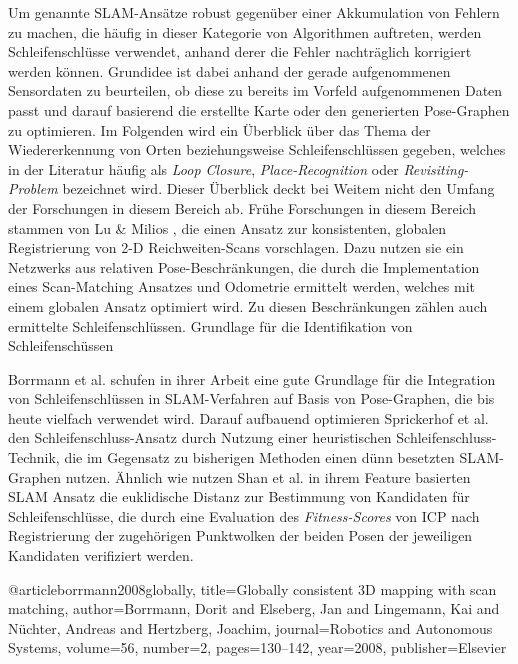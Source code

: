 Um genannte SLAM-Ansätze robust gegenüber einer Akkumulation von Fehlern zu machen, die häufig in dieser Kategorie von Algorithmen auftreten, werden Schleifenschlüsse verwendet, anhand derer die Fehler nachträglich korrigiert werden können. Grundidee ist dabei anhand der gerade aufgenommenen Sensordaten zu beurteilen, ob diese zu bereits im Vorfeld aufgenommenen Daten passt und darauf basierend die erstellte Karte oder den generierten Pose-Graphen zu optimieren. Im Folgenden wird ein Überblick über das Thema der Wiedererkennung von Orten beziehungsweise Schleifenschlüssen gegeben, welches in der Literatur häufig als \emph{Loop Closure}, \emph{Place-Recognition} oder \emph{Revisiting-Problem} bezeichnet wird. Dieser Überblick deckt bei Weitem nicht den Umfang der Forschungen in diesem Bereich ab. Frühe Forschungen in diesem Bereich stammen von Lu \& Milios \cite{lu1997globally}, die einen Ansatz zur konsistenten, globalen Registrierung von 2-D Reichweiten-Scans vorschlagen. Dazu nutzen sie ein Netzwerks aus relativen Pose-Beschränkungen, die durch die Implementation eines Scan-Matching Ansatzes und Odometrie ermittelt werden, welches mit einem globalen Ansatz optimiert wird. Zu diesen Beschränkungen zählen auch ermittelte Schleifenschlüssen. Grundlage für die Identifikation von Schleifenschüssen

Borrmann et al. \cite{borrmann2008globally} schufen in ihrer Arbeit eine gute Grundlage für die Integration von Schleifenschlüssen in SLAM-Verfahren auf Basis von Pose-Graphen, die bis heute vielfach verwendet wird. Darauf aufbauend optimieren Sprickerhof et al. \cite{sprickerhof2011heuristic} den Schleifenschluss-Ansatz durch Nutzung einer heuristischen Schleifenschluss-Technik, die im Gegensatz zu bisherigen Methoden einen dünn besetzten SLAM-Graphen nutzen.
Ähnlich wie \cite{borrmann2008globally} nutzen Shan et al. \cite{shan2020lio} in ihrem Feature basierten SLAM Ansatz die euklidische Distanz zur Bestimmung von Kandidaten für Schleifenschlüsse, die durch eine Evaluation des \emph{Fitness-Scores} von ICP nach Registrierung der zugehörigen Punktwolken der beiden Posen der jeweiligen Kandidaten verifiziert werden.




@article{borrmann2008globally,
  title={Globally consistent 3D mapping with scan matching},
  author={Borrmann, Dorit and Elseberg, Jan and Lingemann, Kai and N{\"u}chter, Andreas and Hertzberg, Joachim},
  journal={Robotics and Autonomous Systems},
  volume={56},
  number={2},
  pages={130--142},
  year={2008},
  publisher={Elsevier}
}

